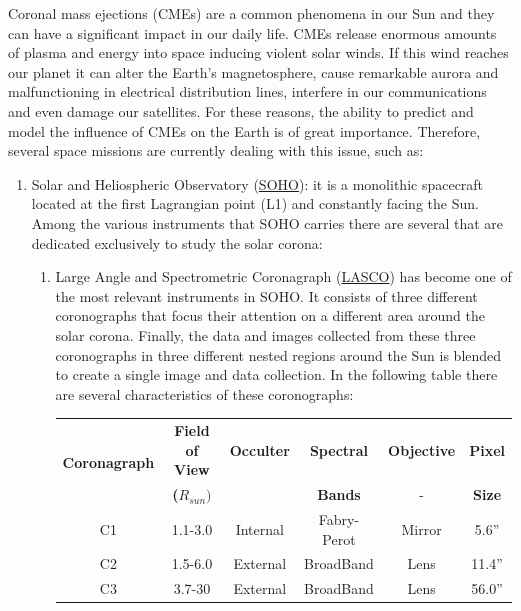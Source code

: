 Coronal mass ejections (CMEs) are a common phenomena in our Sun and
they can have a significant impact in our daily life. CMEs release
enormous amounts of plasma and energy into space inducing violent
solar winds. If this wind reaches our planet it can alter the Earth's
magnetosphere, cause remarkable aurora and malfunctioning in electrical
distribution lines, interfere in our communications and even damage
our satellites. For these reasons, the ability to predict and model
the influence of CMEs on the Earth is of great importance. Therefore,
several space missions are currently dealing with this issue, such
as:
\begin{enumerate}
\item Solar and Heliospheric Observatory (\href{http://www.nasa.gov/mission_pages/soho/index.html\#.UjUrV8YagWA}{SOHO}):
it is a monolithic spacecraft located at the first Lagrangian point
(L1) and constantly facing the Sun. Among the various instruments
that SOHO carries there are several that are dedicated exclusively
to study the solar corona:

\begin{enumerate}
\item Large Angle and Spectrometric Coronagraph (\href{http://lasco-www.nrl.navy.mil/}{LASCO})
has become one of the most relevant instruments in SOHO. It consists
of three different coronographs that focus their attention on a different
area around the solar corona. Finally, the data and images collected
from these three coronographs in three different nested regions around
the Sun is blended to create a single image and data collection. In
the following table there are several characteristics of these coronographs:


\begin{table}[H]
\begin{centering}
\begin{tabular}{|c|c|c|c|c|c|}
\hline 
\multirow{2}{*}{\textbf{Coronagraph}} & \textbf{Field of View} & \textbf{Occulter} & \textbf{Spectral} & \textbf{Objective} & \textbf{Pixel }\tabularnewline
 & \textbf{($R_{sun})$} &  & \textbf{ Bands} & - & \textbf{Size}\tabularnewline
\hline 
\hline 
C1 & 1.1-3.0 & Internal & Fabry-Perot & Mirror & 5.6''\tabularnewline
\hline 
C2 & 1.5-6.0 & External & BroadBand & Lens & 11.4''\tabularnewline
\hline 
C3 & 3.7-30 & External & BroadBand & Lens & 56.0''\tabularnewline
\hline 
\end{tabular}
\par\end{centering}


\end{table}
\end{enumerate}
\end{enumerate}
